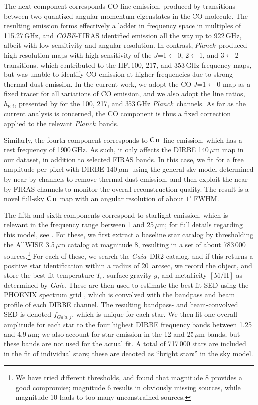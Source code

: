 \documentclass{aa}
\def\Planck{\textit{Planck}}
\def\COBE{\textit{COBE}}
\def\GAIA{\textit{Gaia}}
\newcommand{\CII}{\ensuremath{\textsc{C\,ii}}}
\begin{document}
The next component corresponds CO line emission, produced by
transitions between two quantized angular momentum eigenstates in the
CO molecule. The resulting emission forms effectively a ladder in
frequency space in multiples of 115.27\,GHz, and \COBE-FIRAS
identified emission all the way up to 922\,GHz, albeit with low
sensitivity and angular resolution. In contrast, \Planck\ produced
high-resolution maps with high sensitivity of the $J$=1$\leftarrow$0,
2$\leftarrow$1, and 3$\leftarrow$2 transitions, which contributed to
the HFI\,100, 217, and 353\,GHz frequency maps, but was unable to
identify CO emission at higher frequencies due to strong thermal dust
emission. In the current work, we adopt the \citet{dame:2001} CO
$J$=1$\leftarrow$0 map as a fixed tracer for all variations of CO
emission, and we also adopt the line ratios, $h_{\nu,i}$, presented by
\citet{planck2014-a12} for the 100, 217, and 353\,GHz \Planck\
channels. As far as the current analysis is concerned, the CO
component is thus a fixed correction applied to the relevant
\Planck\ bands.

Similarly, the fourth component corresponds to \CII\ line emission,
which has a rest frequency of 1900\,GHz. As such, it only affects the
DIRBE 140\,$\mu$m map in our dataset, in addition to selected FIRAS
bands. In this case, we fit for a free amplitude per pixel with DIRBE
140\,$\mu$m, using the general sky model determined by near-by
channels to remove thermal dust emission, and then exploit the near-by
FIRAS channels to monitor the overall reconstruction
quality. The result is a novel full-sky \CII\ map with an angular resolution of
about $1^{\circ}$ FWHM.

The fifth and sixth components correspond to starlight emission, which
is relevant in the frequency range between 1 and 25\,$\mu$m; for full
details regarding this model, see \citet{CG02_04}. For these, we first
extract a baseline star catalog by thresholding the AllWISE
3.5\,$\mu$m catalog at magnitude 8, resulting in a set of about
783\,000 sources.\footnote{We have tried different thresholds, and
found that magnitude 8 provides a good compromise; magnitude 6 results
in obviously missing sources, while magnitude 10 leads to too many
unconstrained sources.} For each of these, we search the \GAIA\ DR2
catalog, and if this returns a positive star identification within a
radius of 20~arcsec, we record the object, and store the best-fit
temperature $T_\mathrm{s}$, surface gravity $g$, and metallicity
$[\mathrm{M}/\mathrm{H}]$ as determined by \GAIA. These are then used
to estimate the best-fit SED using the PHOENIX spectrum grid
\citep{husser:2013}, which is convolved with the bandpass and beam
profile of each DIRBE channel. The resulting bandpass- and
beam-convolved SED is denoted $f_{\GAIA,j}$, which is unique for each
star. We then fit one overall amplitude for each star to the four
highest DIRBE frequency bands between 1.25 and 4.9\,$\mu$m; we also
account for star emission in the 12 and 25\,$\mu$m bands, but these
bands are not used for the actual fit. A total of 717\,000 stars are
included in the fit of individual stars; these are denoted as ``bright
stars'' in the sky model.
\end{document}
